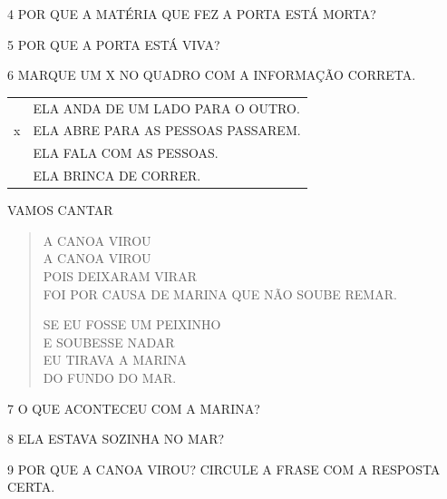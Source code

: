 
\num{4} POR QUE A MATÉRIA QUE FEZ A PORTA ESTÁ MORTA?


\num{5} POR QUE A PORTA ESTÁ VIVA?


\num{6} MARQUE UM X NO QUADRO COM A INFORMAÇÃO CORRETA.

\begin{longtable}[]{@{}ll@{}}
\toprule
& ELA ANDA DE UM LADO PARA O OUTRO.\tabularnewline
x & ELA ABRE PARA AS PESSOAS PASSAREM.\tabularnewline
& ELA FALA COM AS PESSOAS.\tabularnewline
& ELA BRINCA DE CORRER.\tabularnewline
\bottomrule
\end{longtable}

VAMOS CANTAR

\begin{verse}
A CANOA VIROU\\
A CANOA VIROU\\
POIS DEIXARAM VIRAR\\
FOI POR CAUSA DE MARINA QUE NÃO SOUBE REMAR.

SE EU FOSSE UM PEIXINHO\\
E SOUBESSE NADAR\\
EU TIRAVA A MARINA\\
DO FUNDO DO MAR.
\end{verse}


\num{7} O QUE ACONTECEU COM A MARINA?


\num{8} ELA ESTAVA SOZINHA NO MAR?


\num{9} POR QUE A CANOA VIROU? CIRCULE A FRASE COM A RESPOSTA CERTA.

%
%
%
%

